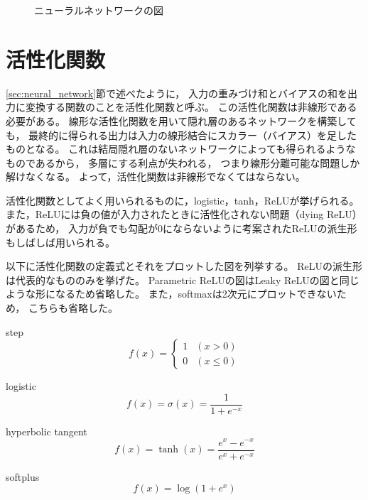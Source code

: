 \documentclass[class=jsarticle, crop=false, dvipdfmx, fleqn]{standalone}
\begin{document}
\begin{figure}
	\centering
	
	\caption{ニューラルネットワークの図}
	\label{fig:neural_network}
\end{figure}



\section{活性化関数}
\label{sec:activate_function}

\ref{sec:neural_network}節で述べたように，
入力の重みづけ和とバイアスの和を出力に変換する関数のことを活性化関数と呼ぶ。
この活性化関数は非線形である必要がある。
線形な活性化関数を用いて隠れ層のあるネットワークを構築しても，
最終的に得られる出力は入力の線形結合にスカラー（バイアス）を足したものとなる。
これは結局隠れ層のないネットワークによっても得られるようなものであるから，
多層にする利点が失われる，
つまり線形分離可能な問題しか解けなくなる。
よって，活性化関数は非線形でなくてはならない。

活性化関数としてよく用いられるものに，logistic，tanh，ReLUが挙げられる。
また，ReLUには負の値が入力されたときに活性化されない問題（dying ReLU）があるため，
入力が負でも勾配が0にならないように考案されたReLUの派生形もしばしば用いられる。

以下に活性化関数の定義式とそれをプロットした図を列挙する。
ReLUの派生形は代表的なもののみを挙げた。
Parametric ReLUの図はLeaky ReLUの図と同じような形になるため省略した。
また，softmaxは2次元にプロットできないため，
こちらも省略した。

step
\begin{equation}
f(x) = 
	\begin{cases}
		1 & (x > 0) \\
		0 & (x \leq 0)
	\end{cases}
\end{equation}

logistic
\begin{equation}
f(x) = \sigma (x) = \frac{1}{1 + e^{-x}}
\end{equation}

hyperbolic tangent
\begin{equation}
f(x) = \tanh (x) = \frac{e^x - e^{-x}}{e^x + e^{-x}}
\end{equation}

softplus
\begin{equation}
f(x) = \log (1 + e^x)
\end{equation}
\end{document}
